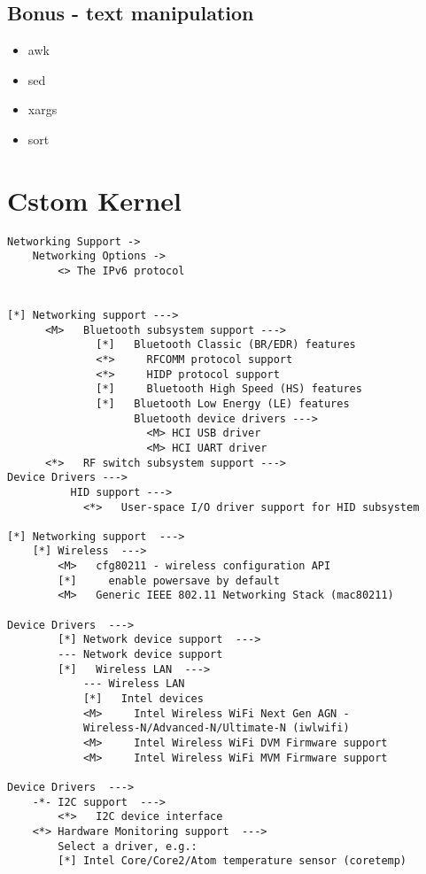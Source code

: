 \documentclass[10pt, a4paper, onecolumn, openany]{book}         %
\begin{document}
\section{Bonus - text manipulation}
\begin{itemize}
    \item awk
    \item sed
    \item xargs
    \item sort
\end{itemize}


\chapter{Cstom Kernel}
\begin{Verbatim}[commandchars=\\\{\}]
Networking Support -> 
    Networking Options ->
        <> The IPv6 protocol


[*] Networking support --->
      <M>   Bluetooth subsystem support --->
              [*]   Bluetooth Classic (BR/EDR) features
              <*>     RFCOMM protocol support
              <*>     HIDP protocol support
              [*]     Bluetooth High Speed (HS) features
              [*]   Bluetooth Low Energy (LE) features
                    Bluetooth device drivers --->
                      <M> HCI USB driver
                      <M> HCI UART driver
      <*>   RF switch subsystem support --->
Device Drivers --->
          HID support --->
            <*>   User-space I/O driver support for HID subsystem

[*] Networking support  --->
    [*] Wireless  --->
        <M>   cfg80211 - wireless configuration API
        [*]     enable powersave by default
        <M>   Generic IEEE 802.11 Networking Stack (mac80211)

Device Drivers  --->
        [*] Network device support  --->
        --- Network device support
        [*]   Wireless LAN  --->
            --- Wireless LAN
            [*]   Intel devices
            <M>     Intel Wireless WiFi Next Gen AGN - 
            Wireless-N/Advanced-N/Ultimate-N (iwlwifi)
            <M>     Intel Wireless WiFi DVM Firmware support
            <M>     Intel Wireless WiFi MVM Firmware support

Device Drivers  --->
    -*- I2C support  --->
        <*>   I2C device interface
    <*> Hardware Monitoring support  --->
        Select a driver, e.g.:
        [*] Intel Core/Core2/Atom temperature sensor (coretemp)   
        

\end{Verbatim}
\end{document}
